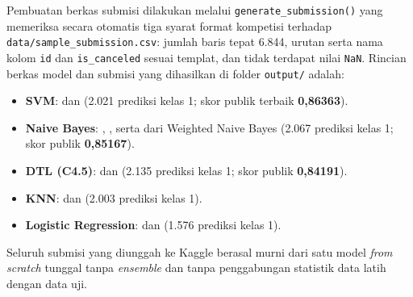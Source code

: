 Pembuatan berkas submisi dilakukan melalui \texttt{generate\_submission()} yang memeriksa secara otomatis
tiga syarat format kompetisi terhadap \texttt{data/sample\_submission.csv}: jumlah baris tepat 6.844,
urutan serta nama kolom \texttt{id} dan \texttt{is\_canceled} sesuai templat, dan tidak terdapat nilai
\texttt{NaN}. Rincian berkas model dan submisi yang dihasilkan di folder \texttt{output/} adalah:
\begin{itemize}
  \item \textbf{SVM}:  dan
         (2.021 prediksi kelas 1; skor publik terbaik \textbf{0,86363}).
  \item \textbf{Naive Bayes}: , ,
        serta  dari Weighted Naive Bayes (2.067 prediksi kelas 1; skor publik \textbf{0,85167}).
  \item \textbf{DTL (C4.5)}:  dan 
        (2.135 prediksi kelas 1; skor publik \textbf{0,84191}).
  \item \textbf{KNN}:  dan  (2.003 prediksi kelas 1).
  \item \textbf{Logistic Regression}:  dan 
        (1.576 prediksi kelas 1).
\end{itemize}
Seluruh submisi yang diunggah ke Kaggle berasal murni dari satu model \textit{from scratch} tunggal tanpa
\textit{ensemble} dan tanpa penggabungan statistik data latih dengan data uji.
